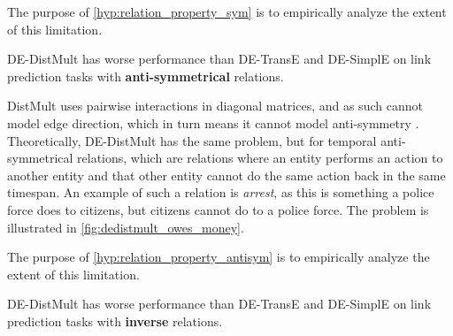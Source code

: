 

The purpose of \autoref{hyp:relation_property_sym} is to empirically analyze the extent of this limitation.


\begin{subhypothesis}
\label{hyp:relation_property_antisym}
DE-DistMult has worse performance than DE-TransE and DE-SimplE on link prediction tasks with \textbf{anti-symmetrical} relations.
\end{subhypothesis}

DistMult uses pairwise interactions in diagonal matrices, and as such cannot model edge direction, which in turn means it cannot model anti-symmetry \cite{goel19diachronicemb}. Theoretically, DE-DistMult has the same problem, but for temporal anti-symmetrical relations, which are relations where an entity performs an action to another entity and that other entity cannot do the same action back in the same timespan. An example of such a relation is \textit{arrest}, as this is something a police force does to citizens, but citizens cannot do to a police force. The problem is illustrated in \autoref{fig:dedistmult_owes_money}.



The purpose of \autoref{hyp:relation_property_antisym} is to empirically analyze the extent of this limitation.


\begin{subhypothesis}
\label{hyp:relation_property_inv}
DE-DistMult has worse performance than DE-TransE and DE-SimplE on link prediction tasks with \textbf{inverse} relations.
\end{subhypothesis}

